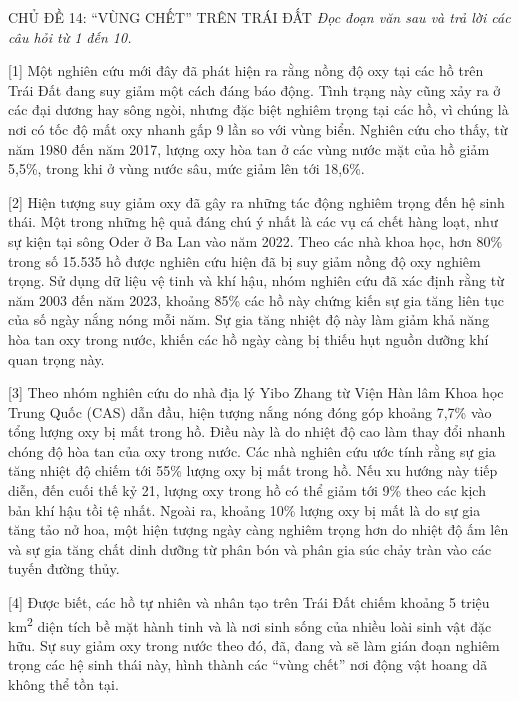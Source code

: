 \documentclass[12pt,a4paper,twoside]{article}
\newenvironment{readingpassage}[1][]{%
    \begin{tcolorbox}[enhanced, colback=grayLight, colframe=secondaryBlue,
        coltitle=textDark, fonttitle=\bfseries, title={#1},
        rounded corners, arc=3mm, boxrule=1pt,
        left=15pt, right=15pt, top=10pt, bottom=10pt,
        breakable, before skip=10pt, after skip=10pt, drop fuzzy shadow]
    \setstretch{1.3}
}{\end{tcolorbox}}
\begin{document}
\newpage
\label{a_cd14}
\begin{topicbox}{\large CHỦ ĐỀ 14: ``VÙNG CHẾT'' TRÊN TRÁI ĐẤT}
\vspace{8pt}
\textit{Đọc đoạn văn sau và trả lời các câu hỏi từ 1 đến 10.}
\vspace{6pt}
\end{topicbox}
\vspace{5pt}
\begin{readingpassage}[]
[1] Một nghiên cứu mới đây đã phát hiện ra rằng nồng độ oxy tại các hồ trên Trái Đất đang suy giảm một cách đáng báo động. Tình trạng này cũng xảy ra ở các đại dương hay sông ngòi, nhưng đặc biệt nghiêm trọng tại các hồ, vì chúng là nơi có tốc độ mất oxy nhanh gấp 9 lần so với vùng biển. Nghiên cứu cho thấy, từ năm 1980 đến năm 2017, lượng oxy hòa tan ở các vùng nước mặt của hồ giảm 5,5\%, trong khi ở vùng nước sâu, mức giảm lên tới 18,6\%.

[2] Hiện tượng suy giảm oxy đã gây ra những tác động nghiêm trọng đến hệ sinh thái. Một trong những hệ quả đáng chú ý nhất là các vụ cá chết hàng loạt, như sự kiện tại sông Oder ở Ba Lan vào năm 2022. Theo các nhà khoa học, hơn 80\% trong số 15.535 hồ được nghiên cứu hiện đã bị suy giảm nồng độ oxy nghiêm trọng. Sử dụng dữ liệu vệ tinh và khí hậu, nhóm nghiên cứu đã xác định rằng từ năm 2003 đến năm 2023, khoảng 85\% các hồ này chứng kiến sự gia tăng liên tục của số ngày nắng nóng mỗi năm. Sự gia tăng nhiệt độ này làm giảm khả năng hòa tan oxy trong nước, khiến các hồ ngày càng bị thiếu hụt nguồn dưỡng khí quan trọng này.

[3] Theo nhóm nghiên cứu do nhà địa lý Yibo Zhang từ Viện Hàn lâm Khoa học Trung Quốc (CAS) dẫn đầu, hiện tượng nắng nóng đóng góp khoảng 7,7\% vào tổng lượng oxy bị mất trong hồ. Điều này là do nhiệt độ cao làm thay đổi nhanh chóng độ hòa tan của oxy trong nước. Các nhà nghiên cứu ước tính rằng sự gia tăng nhiệt độ chiếm tới 55\% lượng oxy bị mất trong hồ. Nếu xu hướng này tiếp diễn, đến cuối thế kỷ 21, lượng oxy trong hồ có thể giảm tới 9\% theo các kịch bản khí hậu tồi tệ nhất. Ngoài ra, khoảng 10\% lượng oxy bị mất là do sự gia tăng tảo nở hoa, một hiện tượng ngày càng nghiêm trọng hơn do nhiệt độ ấm lên và sự gia tăng chất dinh dưỡng từ phân bón và phân gia súc chảy tràn vào các tuyến đường thủy.

[4] Được biết, các hồ tự nhiên và nhân tạo trên Trái Đất chiếm khoảng 5 triệu km\textsuperscript{2} diện tích bề mặt hành tinh và là nơi sinh sống của nhiều loài sinh vật đặc hữu. Sự suy giảm oxy trong nước theo đó, đã, đang và sẽ làm gián đoạn nghiêm trọng các hệ sinh thái này, hình thành các ``vùng chết'' nơi động vật hoang dã không thể tồn tại.


\end{readingpassage}
\end{document}
